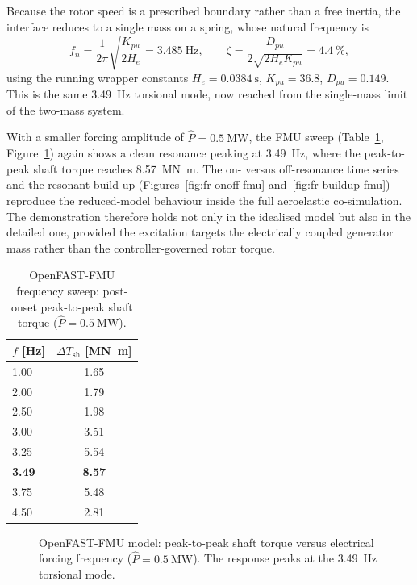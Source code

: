 Because the rotor speed is a prescribed boundary rather than a free inertia, the
interface reduces to a single mass on a spring, whose natural frequency is
\begin{equation}
  f_n = \frac{1}{2\pi}\sqrt{\frac{K_{pu}}{2H_e}} = \SI{3.485}{\hertz},
  \qquad
  \zeta = \frac{D_{pu}}{2\sqrt{2H_e K_{pu}}} = \SI{4.4}{\percent},
  \label{eq:fr-fmu-fn}
\end{equation}
using the running wrapper constants $H_e = \SI{0.0384}{\second}$,
$K_{pu} = 36.8$, $D_{pu} = 0.149$. This is the same \SI{3.49}{\hertz} torsional
mode, now reached from the single-mass limit of the two-mass system.

With a smaller forcing amplitude of $\hat{P} = \SI{0.5}{\mega\watt}$, the FMU
sweep (Table~\ref{tab:fr-fmu-sweep}, Figure~\ref{fig:fr-curve-fmu}) again shows
a clean resonance peaking at \SI{3.49}{\hertz}, where the peak-to-peak shaft
torque reaches \SI{8.57}{\mega\newton\metre}. The on- versus off-resonance time
series and the resonant build-up (Figures~\ref{fig:fr-onoff-fmu}
and~\ref{fig:fr-buildup-fmu}) reproduce the reduced-model behaviour inside the
full aeroelastic co-simulation. The demonstration therefore holds not only in
the idealised model but also in the detailed one, provided the excitation
targets the electrically coupled generator mass rather than the
controller-governed rotor torque.

\begin{table}[t]
  \centering
  \caption{OpenFAST-FMU frequency sweep: post-onset peak-to-peak shaft torque
  ($\hat{P}=\SI{0.5}{\mega\watt}$).}
  \label{tab:fr-fmu-sweep}
  \begin{tabular}{lc}
    \toprule
    $f$ [\si{\hertz}] & $\Delta T_{\mathrm{sh}}$ [\si{\mega\newton\metre}] \\
    \midrule
    1.00 & 1.65 \\
    2.00 & 1.79 \\
    2.50 & 1.98 \\
    3.00 & 3.51 \\
    3.25 & 5.54 \\
    \textbf{3.49} & \textbf{8.57} \\
    3.75 & 5.48 \\
    4.50 & 2.81 \\
    \bottomrule
  \end{tabular}
\end{table}

\begin{figure}[t]
  \centering
  \caption{OpenFAST-FMU model: peak-to-peak shaft torque versus electrical
  forcing frequency ($\hat{P}=\SI{0.5}{\mega\watt}$). The response peaks at the
  \SI{3.49}{\hertz} torsional mode.}
  \label{fig:fr-curve-fmu}
\end{figure}

